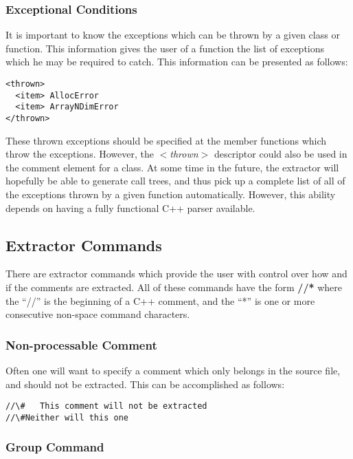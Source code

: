 \subsubsection*{Exceptional Conditions}

It is important to know the exceptions which can be thrown by a given class
or function. This information gives the user of a function the list of
exceptions which he may be required to catch. This information can be 
presented as follows:
\begin{verbatim}
<thrown>
  <item> AllocError
  <item> ArrayNDimError
</thrown>
\end{verbatim}
\noindent
These thrown exceptions should be specified at the member functions which
throw the exceptions. However, the \textit{$<$thrown$>$} descriptor could also be
used in the comment element for a class. At some time in the future, the
extractor will hopefully be able to generate call trees, and thus pick
up a complete list of all of the exceptions thrown by a given function
automatically. However, this ability depends on having a fully functional
C++ parser available.

\subsection{Extractor Commands}

There are extractor commands which provide the user with control over
how and if the comments are extracted. All of these commands have the
form \textbf{//*} where the ``//'' is the beginning of a C++ comment, and the
``*'' is one or more consecutive non-space command characters.

\subsubsection{Non-processable Comment}

Often one will want to specify a comment which only belongs in the source
file, and should not be extracted. This can be accomplished as follows:
\begin{verbatim}
//\#   This comment will not be extracted
//\#Neither will this one
\end{verbatim}

\subsubsection{Group Command}

